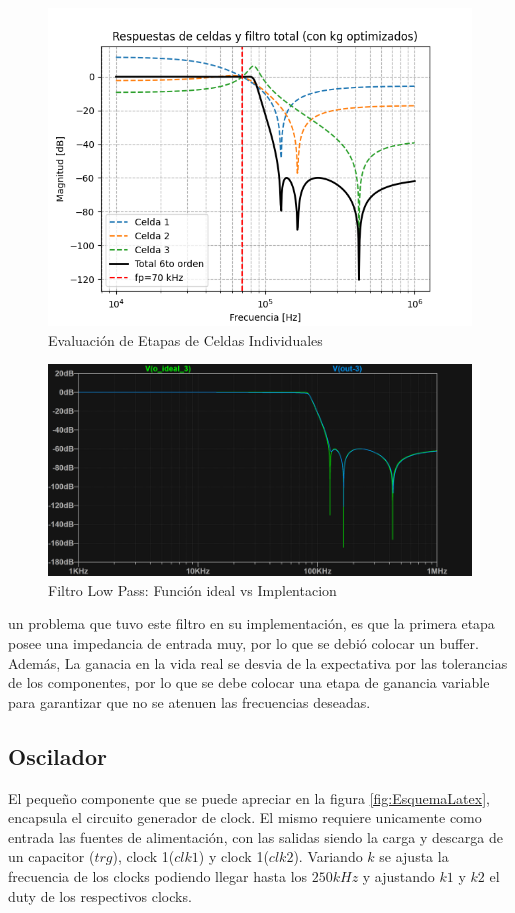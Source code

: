 \begin{figure}[H]
    \centering
    \includegraphics[width=0.8\linewidth]{Imagenes Nacho/Python.png}
    \caption{Evaluaci\'on de Etapas de Celdas Individuales}
    \label{fig:Python}
\end{figure}

\begin{figure}[H]
    \centering
    \includegraphics[width=0.8\linewidth]{Imagenes Nacho/LowPassFitler.png}
    \caption{Filtro Low Pass: Funci\'on ideal vs Implentacion}
    \label{fig:LowPassFitler}
\end{figure}

un problema que tuvo este filtro en su implementaci\'on, es que la primera etapa posee una impedancia de entrada muy, por lo que se debi\'o colocar un buffer. Adem\'as, La ganacia en la vida real se desvia de la expectativa por las tolerancias de los componentes, por lo que se debe colocar una etapa de ganancia variable para garantizar que no se atenuen las frecuencias deseadas.

\subsection{Oscilador}

El pequeño componente que se puede apreciar en la figura \ref{fig:EsquemaLatex}, encapsula el circuito generador de clock. El mismo requiere unicamente como entrada las fuentes de alimentaci\'on, con las salidas siendo la carga y descarga de un capacitor ($trg$), clock 1($clk1$) y clock 1($clk2$). Variando $k$ se ajusta la frecuencia de los clocks podiendo llegar hasta los $250kHz$ y ajustando $k1$ y $k2$ el duty de los respectivos clocks. 


